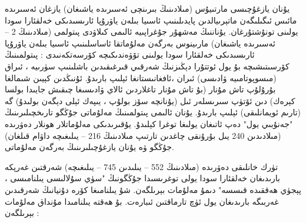 \documentclass[a4paper]{article}
\begin{document}
\begin{flushright}
يۇنان يازغۇچىسى مارتىيۇس (مىلادىنىڭ بىرىنچى ئەسىرىدە ياشىغان) يازغان ئەسىرىدە مائىس ئىگىلىگەن ماتېرىيالدىن پايدىلىنىپ ئاسىيا بىلەن ياۋرۇپا ئارىسىدىكى خەلقئارا سودا يولىنى تونۇشتۇرغان. يۇناننىڭ مەشھۇر جۇغراپىيە ئالىمى كىلاۋدى پىتولمى (مىلادىنىڭ 2 – ئەسىرىدە ياشىغان) مارىينوس بەرگەن مەلۇماتقا ئاساسلىنىپ ئاسىيا بىلەن ياۋرۇپا ئارىسىدىكى خەلقئارا سودا يولىنى تۆۋەندىكىچە كۆرسەتكەنىدى : پىتولمىنىڭ كۆرسىتىشىچە بۇ يول ئوتتۇرا دېڭىزنىڭ شەرقىي قىرغىقىدىن باشلىنىپ سۈرىيە ، ئىراق (مىسوپوتامىيە ۋادىسى) ئىران ،ئافغانىستانغا ئېلىپ بارىدۇ. ئۇنىڭدىن كېيىن شىمالغا بۇرۇلۇپ تاش مۇنار (بۇ تاش مۇنار تاغلاردىن ئالاي ۋادىسىغا چىقىش جايىدا بولسا كېرەك) دىن ئۆتۈپ سىرىسلەر ئىل (يۇنانچە سۆز بولۇپ ، يىپەك ئېلى دېگەن بولىدۇ) گە (تارىم ئويمانلىقى) ئېلىپ بارىدۇ. يۇنان ئالىمى پىتولمىنىڭ مەلۇماتى جۇڭگو تارىخچىلىرىنىڭ "جەنۇبىي يول" دەپ ئاتىغان يولىغا توغرا كېلىدۇ. يۇقىرىدىكى مەلۇماتلار ھونلار دەۋرىدە (مىلادىدىن 240 يىل بۇرۇنقى چاغدىن تارتىپ مىلادىنىڭ 216 – يىلىغىچە داۋام قىلغان) جۇڭگو ۋە يۇنان يازغۇچىلىرىنىڭ بەرگەن مەلۇماتى.



تۈرك خانلىقى دەۋرىدە (مىلادىنىڭ 552 – يىلىدىن 745 – يىلىغىچە) شەرقتىن غەرپكە بارىدىغان خەلقئارا سودا يولى توغرىسىدا جۇڭگونىڭ "سۈي سۇلالىسى يىلنامىسى ، پېجۈي ھەققىدە قىسسە" دىمۇ مەلۇمات بېرىلگەن. شۇ يىلنامىغا كۆرە دۇنيانىڭ شەرقىدىن غەربىگە بارىدىغان يول ئۈچ تارماقتىن ئىبارەت. بۇ ھەقتە يىلنامىدا مۇنداق مەلۇمات بېرىلگەن :




\end{flushright}
\end{document}
